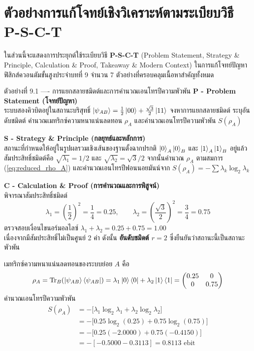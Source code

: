 \section{ตัวอย่างการแก้โจทย์เชิงวิเคราะห์ตามระเบียบวิธี P-S-C-T}

ในส่วนนี้จะแสดงการประยุกต์ใช้ระเบียบวิธี \textbf{P-S-C-T} (Problem Statement, Strategy \& Principle, Calculation \& Proof, Takeaway \& Modern Context) ในการแก้โจทย์ปัญหาฟิสิกส์ควอนตัมขั้นสูงประจำบทที่ 9 จำนวน 7 ตัวอย่างที่ครอบคลุมเนื้อหาสำคัญทั้งหมด

\begin{psctbox}{ตัวอย่างที่ 9.1 ---- การแยกสลายชมิดต์และการคำนวณเอนโทรปีความพัวพัน}
\noindent\textbf{P - Problem Statement (โจทย์ปัญหา)} \\
ระบบสองคิวบิตอยู่ในสถานะบริสุทธิ์ $\ket{\psi_{AB}} = \frac{1}{2}\ket{00} + \frac{\sqrt{3}}{2}\ket{11}$ จงหาการแยกสลายชมิดต์ ระบุอันดับชมิดต์ คำนวณเมทริกซ์ความหนาแน่นลดทอน $\rho_A$ และคำนวณเอนโทรปีความพัวพัน $S(\rho_A)$

\vspace{4pt}
\noindent\textbf{S - Strategy \& Principle (กลยุทธ์และหลักการ)} \\
สถานะที่กำหนดให้อยู่ในรูปผลรวมเชิงเส้นของฐานตั้งฉากปรกติ $\ket{0}_A\ket{0}_B$ และ $\ket{1}_A\ket{1}_B$ อยู่แล้ว สัมประสิทธิ์ชมิดต์คือ $\sqrt{\lambda_1} = 1/2$ และ $\sqrt{\lambda_2} = \sqrt{3}/2$ จากนั้นคำนวณ $\rho_A$ ตามสมการ (\ref{eq:reduced_rho_A}) และคำนวณเอนโทรปีฟอนนอยมันน์จาก $S(\rho_A) = -\sum \lambda_k \log_2 \lambda_k$

\vspace{4pt}
\noindent\textbf{C - Calculation \& Proof (การคำนวณและการพิสูจน์)} \\
พิจารณาสัมประสิทธิ์ชมิดต์
\begin{equation}
\lambda_1 = \left(\frac{1}{2}\right)^2 = \frac{1}{4} = 0.25, \qquad \lambda_2 = \left(\frac{\sqrt{3}}{2}\right)^2 = \frac{3}{4} = 0.75
\end{equation}
ตรวจสอบเงื่อนไขนอร์มอลไลซ์ $\lambda_1 + \lambda_2 = 0.25 + 0.75 = 1.00$ \\
เนื่องจากมีสัมประสิทธิ์ไม่เป็นศูนย์ 2 ค่า ดังนั้น \textbf{อันดับชมิดต์ $r = 2$} ซึ่งยืนยันว่าสถานะนี้เป็นสถานะพัวพัน

เมทริกซ์ความหนาแน่นลดทอนของระบบย่อย $A$ คือ
\begin{equation}
\rho_A = \text{Tr}_B(\ket{\psi_{AB}}\bra{\psi_{AB}}) = \lambda_1 \ket{0}\bra{0} + \lambda_2 \ket{1}\bra{1} = \begin{pmatrix} 0.25 & 0 \\ 0 & 0.75 \end{pmatrix}
\end{equation}
คำนวณเอนโทรปีความพัวพัน
\begin{align}
S(\rho_A) &= -\Big[ \lambda_1 \log_2 \lambda_1 + \lambda_2 \log_2 \lambda_2 \Big] \nonumber \\
&= -\Big[ 0.25 \log_2(0.25) + 0.75 \log_2(0.75) \Big] \nonumber \\
&= -\Big[ 0.25(-2.0000) + 0.75(-0.4150) \Big] \nonumber \\
&= -[-0.5000 - 0.3113] = 0.8113\text{ ebit}
\end{align}


\end{psctbox}
